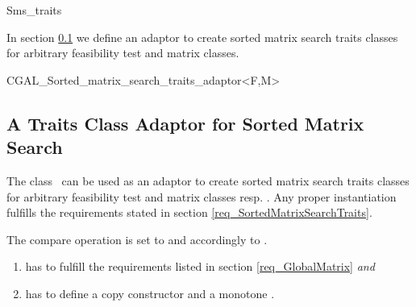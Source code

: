 \begin{ccAdvanced}
\begin{ccClass}{Sms_traits}
    \ccSeeAlso
    
    In section \ref{sec_SortedMatrixSearchTraitsAdaptor} we define an
    adaptor  to create
    sorted matrix search traits classes for arbitrary feasibility test
    and matrix classes.
    
    \ccTagDefaults
  \end{ccClass}
  
  \ccHtmlNoClassToc
  \begin{ccClassTemplate}{CGAL_Sorted_matrix_search_traits_adaptor<F,M>}
    \ccTagFullDeclarations
    \subsection{A Traits Class Adaptor for Sorted Matrix Search}
    \label{sec_SortedMatrixSearchTraitsAdaptor}
    
    
    \ccDefinition The class \ccClassTemplateName\ can be used as an
    adaptor to create sorted matrix search traits classes for
    arbitrary feasibility test and matrix classes  resp.
    . Any proper instantiation fulfills the requirements stated
    in section \ref{req_SortedMatrixSearchTraits}.
    
    The compare operation  is set to
     and  accordingly to
    .
    

    \begin{enumerate}
    \item {} has to fulfill the requirements listed in section
      \ref{req_GlobalMatrix} \textit{and}
    \item {} has to define a copy constructor and a monotone
      .
    \end{enumerate}

    \ccCreation
    
    
    \ccTagDefaults
  \end{ccClassTemplate}
\end{ccAdvanced}

